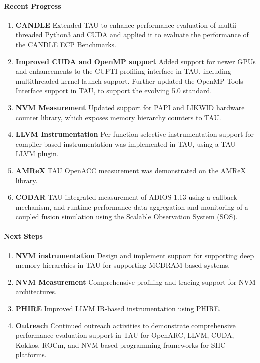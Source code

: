 \paragraph{Recent Progress}
\begin{enumerate}
\item \textbf{CANDLE} Extended TAU to enhance performance evaluation of multii-threaded Python3 and CUDA and applied it to evaluate the performance of the CANDLE ECP Benchmarks.

\item \textbf{Improved CUDA and OpenMP support} Added support for newer GPUs and enhancements to the CUPTI profiling interface in TAU, including multithreaded kernel launch support.  Further updated the OpenMP Tools Interface support in TAU, to support the evolving 5.0 standard. 

\item \textbf{NVM Measurement} Updated support for PAPI and LIKWID hardware counter library, which exposes memory hierarchy counters to TAU.

\item \textbf{LLVM Instrumentation} Per-function selective instrumentation support for compiler-based instrumentation was implemented in TAU, using a TAU LLVM plugin.

\item \textbf{AMReX} TAU OpenACC measurement was demonstrated on the AMReX library.

\item \textbf{CODAR} TAU integrated measurement of ADIOS 1.13 using a callback mechanism, and runtime performance data aggregation and monitoring of a coupled fusion simulation using the Scalable Observation System (SOS).
\end{enumerate}

\paragraph{Next Steps}
\begin{enumerate}
\item \textbf{NVM instrumentation} 
Design and implement support for supporting deep memory hierarchies in TAU for supporting MCDRAM based systems. 

\item \textbf{NVM Measurement} 
Comprehensive profiling and tracing support for NVM architectures.

\item \textbf{PHIRE} 
Improved LLVM IR-based instrumentation using PHIRE.

\item \textbf{Outreach}
Continued outreach activities to demonstrate comprehensive performance evaluation support in TAU for OpenARC, LLVM, CUDA, Kokkos, ROCm, and NVM based programming frameworks for SHC platforms. 
\end{enumerate}
